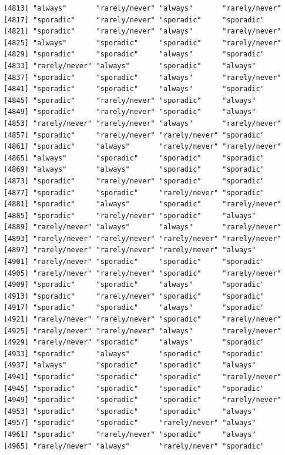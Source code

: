 \documentclass[
  letterpaper,
  DIV=11,
  numbers=noendperiod]{scrartcl}
\begin{document}
\begin{verbatim}
[4813] "always"       "rarely/never" "always"       "rarely/never"
[4817] "sporadic"     "rarely/never" "sporadic"     "sporadic"    
[4821] "sporadic"     "rarely/never" "always"       "rarely/never"
[4825] "always"       "sporadic"     "sporadic"     "rarely/never"
[4829] "sporadic"     "sporadic"     "always"       "sporadic"    
[4833] "rarely/never" "always"       "sporadic"     "always"      
[4837] "sporadic"     "sporadic"     "always"       "rarely/never"
[4841] "sporadic"     "sporadic"     "always"       "sporadic"    
[4845] "sporadic"     "rarely/never" "sporadic"     "always"      
[4849] "sporadic"     "rarely/never" "sporadic"     "always"      
[4853] "rarely/never" "rarely/never" "always"       "rarely/never"
[4857] "sporadic"     "rarely/never" "rarely/never" "sporadic"    
[4861] "sporadic"     "always"       "rarely/never" "rarely/never"
[4865] "always"       "sporadic"     "sporadic"     "sporadic"    
[4869] "always"       "always"       "sporadic"     "sporadic"    
[4873] "sporadic"     "rarely/never" "sporadic"     "sporadic"    
[4877] "sporadic"     "sporadic"     "rarely/never" "sporadic"    
[4881] "sporadic"     "always"       "sporadic"     "rarely/never"
[4885] "sporadic"     "rarely/never" "sporadic"     "always"      
[4889] "rarely/never" "always"       "always"       "rarely/never"
[4893] "rarely/never" "rarely/never" "rarely/never" "rarely/never"
[4897] "rarely/never" "rarely/never" "rarely/never" "always"      
[4901] "rarely/never" "sporadic"     "sporadic"     "sporadic"    
[4905] "rarely/never" "rarely/never" "sporadic"     "rarely/never"
[4909] "sporadic"     "sporadic"     "always"       "sporadic"    
[4913] "sporadic"     "rarely/never" "sporadic"     "sporadic"    
[4917] "sporadic"     "sporadic"     "always"       "sporadic"    
[4921] "rarely/never" "rarely/never" "sporadic"     "rarely/never"
[4925] "rarely/never" "rarely/never" "always"       "rarely/never"
[4929] "rarely/never" "sporadic"     "always"       "sporadic"    
[4933] "sporadic"     "always"       "sporadic"     "sporadic"    
[4937] "always"       "sporadic"     "sporadic"     "always"      
[4941] "sporadic"     "sporadic"     "sporadic"     "rarely/never"
[4945] "sporadic"     "sporadic"     "sporadic"     "sporadic"    
[4949] "sporadic"     "sporadic"     "sporadic"     "rarely/never"
[4953] "sporadic"     "sporadic"     "sporadic"     "always"      
[4957] "sporadic"     "sporadic"     "rarely/never" "always"      
[4961] "sporadic"     "rarely/never" "sporadic"     "always"      
[4965] "rarely/never" "always"       "rarely/never" "sporadic"    

\end{verbatim}
\end{document}
